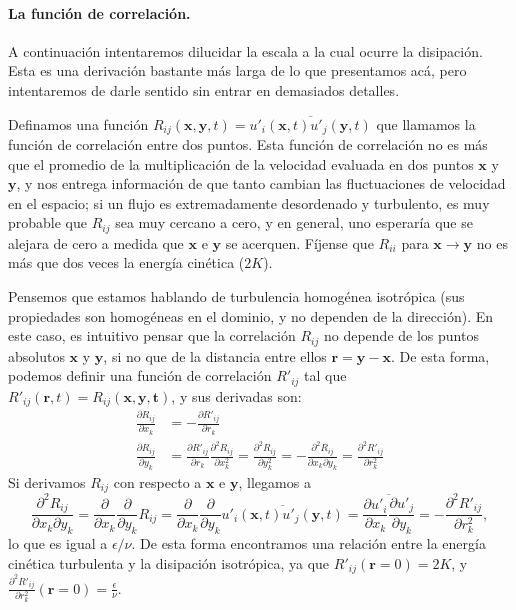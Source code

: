\paragraph*{La función de correlación.}
A continuación intentaremos dilucidar la escala a la cual ocurre la disipación.
Esta es una derivación bastante más larga de lo que presentamos acá, pero intentaremos de darle sentido sin entrar en demasiados detalles.

Definamos una función $R_{ij}(\mathbf{x},\mathbf{y},t) = \overline{u'_i(\mathbf{x},t)u'_j(\mathbf{y},t)}$ que llamamos la función de correlación entre dos puntos.
Esta función de correlación no es más que el promedio de la multiplicación de la velocidad evaluada en dos puntos $\mathbf{x}$ y $\mathbf{y}$, y nos entrega información de que tanto cambian las fluctuaciones de velocidad en el espacio; si un flujo es extremadamente desordenado y turbulento, es muy probable que $R_{ij}$ sea muy cercano a cero, y en general, uno esperaría que se alejara de cero a medida que $\mathbf{x}$ e $\mathbf{y}$ se acerquen.
Fíjense que $R_{ii}$ para $\mathbf{x}\to\mathbf{y}$ no es más que dos veces la energía cinética ($2K$).

Pensemos que estamos hablando de turbulencia homogénea isotrópica (sus propiedades son homogéneas en el dominio, y no dependen de la dirección).
En este caso, es intuitivo pensar que la correlación $R_{ij}$ no depende de los puntos absolutos $\mathbf{x}$ y $\mathbf{y}$, si no que de la distancia entre ellos $\mathbf{r} = \mathbf{y}-\mathbf{x}$.
De esta forma, podemos definir una función de correlación $R'_{ij}$ tal que $R'_{ij}(\mathbf{r},t) = R_{ij}(\mathbf{x},\mathbf{y},\mathbf{t})$, y sus derivadas son:
%
\begin{align}
\frac{\partial R_{ij}}{\partial x_k} &= -\frac{\partial R'_{ij}}{\partial r_k} \nonumber \\
\frac{\partial R_{ij}}{\partial y_k} &= \frac{\partial R'_{ij}}{\partial r_k} 
\frac{\partial^2 R_{ij}}{\partial x_k^2} = \frac{\partial^2 R_{ij}}{\partial y_k^2} = -\frac{\partial^2 R_{ij}}{\partial x_k\partial y_k} = \frac{\partial^2 R'_{ij}}{\partial r_k^2} 
\end{align}
%
Si derivamos $R_{ij}$ con respecto a $\mathbf{x}$ e $\mathbf{y}$, llegamos a
%
\begin{equation}
\frac{\partial^2R_{ij}}{\partial x_k\partial y_k} = \frac{\partial}{\partial x_k}\frac{\partial}{\partial y_k} R_{ij} =\frac{\partial}{\partial x_k}\frac{\partial}{\partial y_k} \overline{u'_i(\mathbf{x},t)u'_j(\mathbf{y},t)} = \overline{\frac{\partial u'_i}{\partial x_k}\frac{\partial u'_j}{\partial y_k}} = -\frac{\partial^2 R'_{ij}}{\partial r_k^2},
\end{equation}
%
lo que es igual a $\epsilon/\nu$.
De esta forma encontramos una relación entre la energía cinética turbulenta y la disipación isotrópica, ya que $R'_{ij}(\mathbf{r}=0) = 2K$, y $\frac{\partial^2 R'_{ij}}{\partial r_k^2}(\mathbf{r}=0) = \frac{\epsilon}{\nu}$.

